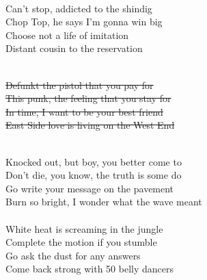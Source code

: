 \\
Can't stop, addicted to the shindig \\
Chop Top, he says I'm gonna win big \\
Choose not a life of imitation \\
Distant cousin to the reservation \\
\\
\begin{footnotesize}
	{\color{gray}\sout{
			Defunkt the pistol that you pay for \\
			This punk, the feeling that you stay for \\
			In time, I want to be your best friend \\
			East Side love is living on the West End \\
		}}
\end{footnotesize}
\\
Knocked out, but boy, you better come to \\
Don't die, you know, the truth is some do \\
Go write your message on the pavement \\
Burn so bright, I wonder what the wave meant \\
\\
White heat is screaming in the jungle \\
Complete the motion if you stumble \\
Go ask the dust for any answers \\
Come back strong with 50 belly dancers
